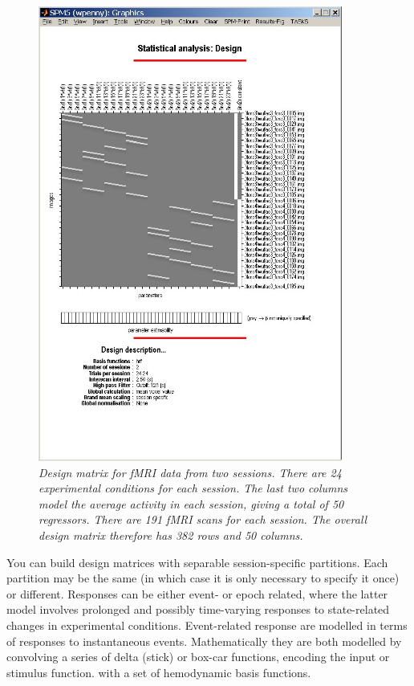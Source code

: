 \begin{figure}
\begin{center}
\includegraphics[width=100mm]{fmri_spec/design}
\end{center}
\caption{\em Design matrix for fMRI data from two sessions. There are 24 experimental conditions for each session. The last two columns model the average activity in each session, giving a total of 50 regressors. There are 191 fMRI scans for each session. The overall design matrix therefore has 382 rows and 50 columns. \label{design}}
\end{figure}

You can build design matrices with separable session-specific partitions.  Each partition may be the same (in which case it is only necessary to specify it once) or different.  Responses can be either event- or epoch related, where the latter model involves prolonged and possibly time-varying responses to state-related changes in experimental conditions.  Event-related response are modelled in terms of responses to instantaneous events.  Mathematically they are both modelled by convolving a series of delta (stick) or box-car functions, encoding the input or stimulus function. with a set of hemodynamic basis functions.

